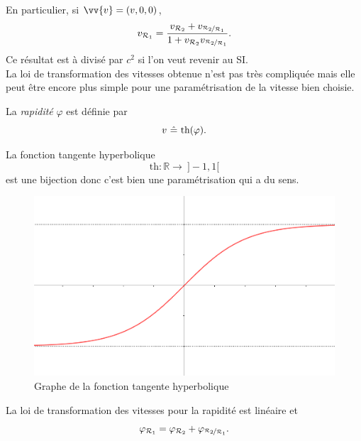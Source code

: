 \documentclass[a4paper,11pt]{report}
\begin{document}
            En particulier, si $\vv{v} = (v,0,0)$, 
            \begin{equation}
                v_{\mathcal{R}_1}  = \frac{v_{\mathcal{R}_2}+v_{\nicefrac{\mathcal{R}_2}{\mathcal{R}_1}}}{1+v_{\mathcal{R}_2}v_{\nicefrac{\mathcal{R}_2}{\mathcal{R}_1}}}.
                \label{LTVx}
            \end{equation}
            Ce résultat est à divisé par $c^2$ si l'on veut revenir au SI.\\
            
            La loi de transformation des vitesses obtenue n'est pas très compliquée mais elle peut être encore plus simple pour une paramétrisation de la vitesse bien choisie.
            
            \begin{definition}
                La \textit{rapidité} $\varphi$ est définie par
                \begin{equation}
                    v~\hat{=}~\text{th}(\varphi).
                \end{equation}
            \end{definition}
            
            La fonction tangente hyperbolique 
            $$\text{th}:\mathbb{R}\to~ ]-1,1[$$ 
            est une bijection donc c'est bien une paramétrisation qui a du sens.
            
            \begin{figure}[H]
            \centering
            \includegraphics[scale = 0.4]{Pictures/Tanh.PNG}
            \caption{Graphe de la fonction tangente hyperbolique}
            \end{figure}
            
            \begin{prop}\begin{leftbar}
                La loi de transformation des vitesses pour la rapidité est linéaire et 
                \begin{equation}
                    \varphi_{\mathcal{R}_1} = \varphi_{\mathcal{R}_2}+\varphi_{\nicefrac{\mathcal{R}_2}{\mathcal{R}_1}}.
                \end{equation}
            \end{leftbar}\end{prop}
            
\end{document}
